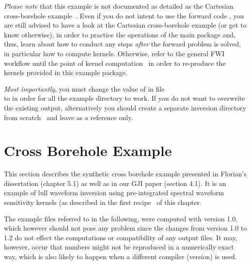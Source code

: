 \emph{Please note} that this example is not documented as detailed as the 
Cartesian cross-borehole example~. Even if you do not intent to use 
the forward code , you are still advised to have a look at the Cartesian
cross-borehole example (or get to know \ASKI{} otherwise), in order to practice the operations of the main \ASKI{}
package and, thus, learn about how to conduct any steps \emph{after} the forward problem is solved, in particular
how to compute kernels. Otherwise, refer to the general FWI workflow until the point of kernel 
computation~ in order to re-produce the kernels provided in this 
example package.

\emph{Most importantly}, you must change the value of 
in file\\
 to
 in order for all the example directory to work. 
If you do not want to overwrite the existing output, alternatively you 
should create a separate inversion directory from scratch~
and leave 
as a reference only. 
%
%
\newpage
\section{Cross Borehole Example} \label{guide,sec:example_C_borehole}
%
%
This section describes the synthetic cross borehole example presented in Florian's dissertation 
\cite{_743d334d-dfa4-4a16-8cc5-91cdadc95271} (chapter 5.1) as well as in our GJI paper \cite{Schumacher16} 
(section 4.1). It is an example of lull waveform inversion using pre-integrated spectral waveform sensitivity 
kernels (as described in the first recipe~ of this chapter. 

The example files referred to in the following, were computed with \ASKI{} version 1.0, which however should
not pose any problem since the changes from version 1.0 to 1.2 do not effect the computations or compatibility
of any output files. It may, however, 
occur that numbers might not be reproduced in a numerically exact way, which is also likely to happen
when a different compiler (version) is used. 

